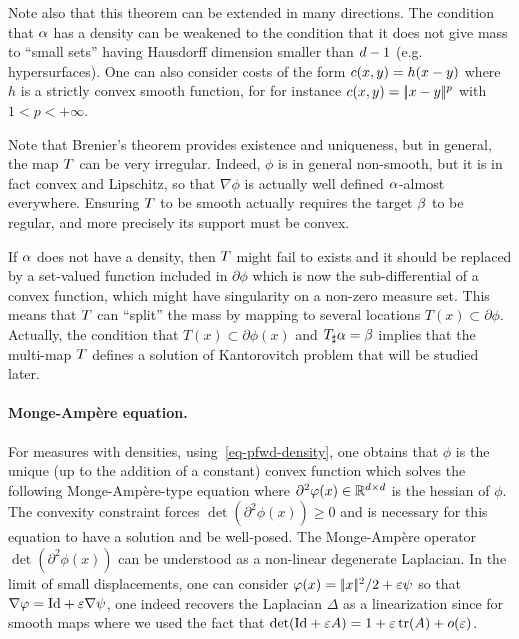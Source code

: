 Note also that this theorem can be extended in many directions.  
% 
The condition that $\alpha$ has a density can be weakened to the condition that it does not give mass to ``small sets'' having Hausdorff dimension smaller than $d-1$ (e.g. hypersurfaces). 
%
One can also consider costs of the form $c(x,y)=h(x-y)$ where $h$ is a strictly convex smooth function, for for instance $c(x,y)=|\!| x-y |\!|^p$ with $1<p<+\infty$. 

Note that Brenier's theorem provides existence and uniqueness, but in general, the map $T$ can be very irregular. 
%
Indeed, $\phi$ is in general non-smooth, but it is in fact convex and Lipschitz, so that $\nabla \phi$ is actually well defined $\alpha$-almost everywhere. Ensuring $T$ to be smooth actually requires the target $\beta$ to be regular, and  more precisely its support must be convex.

If $\alpha$ does not have a density, then $T$ might fail to exists and it should be replaced by a set-valued function included in $\partial\phi$ which is now the sub-differential of a convex function, which might have singularity on a non-zero measure set. This means that $T$ can ``split'' the mass by mapping to several locations  $T(x) \subset \partial\phi$. Actually, the condition that $T(x) \subset \partial\phi(x)$ and $T_\sharp \alpha=\beta$ implies that the multi-map $T$ defines a solution of Kantorovitch problem that will be studied later. 



\paragraph{Monge-Amp\`ere equation.}

For measures with densities, using~\eqref{eq-pfwd-density}, one obtains that $\phi$ is the unique (up to the addition of a constant) convex function which solves the following Monge-Ampère-type equation
where $\partial^2\varphi(x) \in \mathbb{R}^{d \times d}$ is the hessian of $\phi$. 
%
The convexity constraint forces $\det(\partial^2\phi(x)) \geq 0$ and is necessary for this equation to have a solution and be well-posed. 
%
The Monge-Amp\`ere operator $\det(\partial^2\phi(x))$ can be understood as a non-linear degenerate Laplacian. In the limit of small displacements, one can consider $\varphi(x)=|\!| x |\!|^2/2 + \varepsilon\psi$ so that $\nabla \varphi = \mathrm{Id}+\varepsilon \nabla \psi$, one indeed recovers the Laplacian $\Delta$ as a linearization since for smooth maps
where we used the fact that $\det(\mathrm{Id}+\varepsilon A) = 1+\varepsilon\operatorname{tr}(A)+o(\varepsilon)$. 



